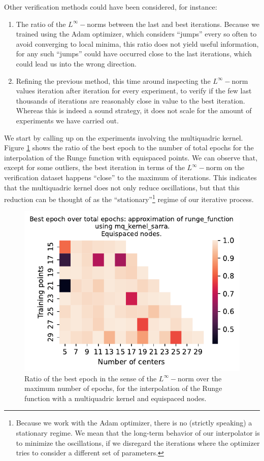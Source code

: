 \documentclass[12pt]{report} %
\begin{document}
Other verification methods could have been considered, for instance:
\begin{enumerate}
  \item The ratio of the $L^\infty-$norms between the last and best iterations. Because we trained using the Adam optimizer, which considers ``jumps'' every so often to avoid converging to local minima, this ratio does not yield useful information, for any such ``jumps'' could have occurred close to the last iterations, which could lead us into the wrong direction.
  \item Refining the previous method, this time around inspecting the $L^\infty-$norm values iteration after iteration for every experiment, to verify if the few last thousands of iterations are reasonably close in value to the best iteration. Whereas this is indeed a sound strategy, it does not scale for the amount of experiments we have carried out.
\end{enumerate}

We start by calling up on the experiments involving the multiquadric kernel. Figure \ref{fig:epochs-sarra-kernel-report} shows the ratio of the best epoch to the number of total epochs for the interpolation of the Runge function with equispaced points. We can observe that, except for some outliers, the best iteration in terms of the $L^\infty-$norm on the verification dataset happens ``close'' to the maximum of iterations. This indicates that the multiquadric kernel does not only reduce oscillations, but that this reduction can be thought of as the ``stationary''\footnote{Because we work with the Adam optimizer, there is no (strictly speaking) a stationary regime. We mean that the long-term behavior of our interpolator is to minimize the oscillations, if we disregard the iterations where the optimizer tries to consider a different set of parameters.} regime of our iterative process.

\begin{figure}[ht]
  \centering
  \includegraphics[width=.49\textwidth]{imagenes/experiments/1d/variational_epochs/runge_function-Kmq_kernel_sarra-Equi-epochs.pdf}
  \caption{Ratio of the best epoch in the sense of the $L^\infty-$norm over the maximum number of epochs, for the interpolation of the Runge function with a multiquadric kernel and equispaced nodes.}
  \label{fig:epochs-sarra-kernel-report}
\end{figure}
\end{document}
